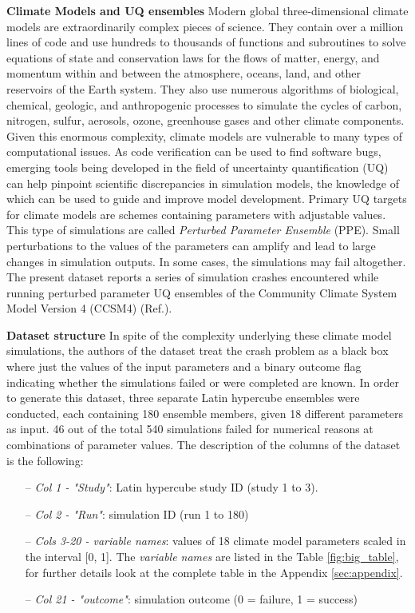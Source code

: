 \documentclass[english,notitlepage,reprint,nofootinbib]{revtex4-1}  %
\begin{document}
\textbf{Climate Models and UQ ensembles} Modern global three-dimensional climate models are extraordinarily complex pieces of science. They contain over a million lines of code and use hundreds to thousands of functions and subroutines to solve equations of state and conservation laws for the flows of matter, energy, and momentum within and between the atmosphere, oceans, land, and other reservoirs of the Earth system. They also use numerous algorithms of biological, chemical, geologic, and anthropogenic processes to simulate the cycles of carbon, nitrogen, sulfur, aerosols, ozone, greenhouse gases and other climate components. Given this enormous complexity, climate models are vulnerable to many types of computational issues. As code verification can be used to find software bugs, emerging tools being developed in the field of uncertainty quantification (UQ) can help pinpoint scientific discrepancies in simulation models, the knowledge of which can be used to guide and improve model development. Primary UQ targets for climate models are schemes containing parameters with adjustable values. This type of simulations are called \textit{Perturbed Parameter Ensemble} (PPE). Small perturbations to the values of the parameters can amplify and lead to large changes in simulation outputs. In some cases, the simulations may fail altogether. The present dataset reports a series of simulation crashes encountered while running perturbed parameter UQ ensembles of the Community Climate System Model Version 4 (CCSM4) (Ref.\cite{failure}).

\textbf{Dataset structure}
In spite of the complexity underlying these climate model simulations, the authors of the dataset treat the crash problem as a black box where just the values of the input parameters and a binary outcome flag indicating whether the simulations failed or were completed are known. In order to generate this dataset, three separate Latin hypercube ensembles were conducted, each containing 180 ensemble members, given 18 different parameters as input. 46 out of the total 540 simulations failed for numerical reasons at combinations of parameter values.
The description of the columns of the dataset is the following:

\begin{itemize}
    \item[–] \textit{Col 1 - "Study"}: Latin hypercube study ID (study 1 to 3).
    \item[–] \textit{Col 2 - "Run"}: simulation ID (run 1 to 180)
    \item[–] \textit{Cols 3-20 - variable names}: values of 18 climate model parameters scaled in the interval [0, 1]. The \textit{variable names} are listed in the Table \ref{fig:big_table}, for further details look at the complete table in the Appendix \ref{sec:appendix}.
    \item[–] \textit{Col 21 - "outcome"}: simulation outcome (0 = failure, 1 = success)
\end{itemize}
\end{document}
